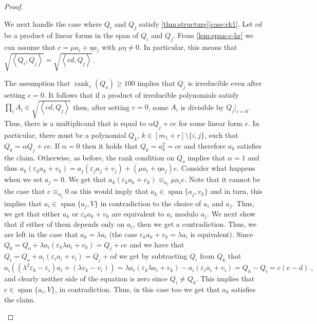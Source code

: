 \documentclass[10pt,a4paper]{article}
\def\rank{\operatorname{rank}}
\newcommand{\ideal}[1]{\left \langle{#1}\right \rangle}
\newcommand{\spn}[1]{\operatorname{span}\{{#1}\}}
\def\epsilon{\varepsilon}
\newcommand{\rkq}{100}
\begin{document}
\begin{proof}
\begin{enumerate}[label=(\roman*)]
	We next handle the case where $Q_i$ and $Q_j$ satisfy \autoref{thm:structure}\ref{case:rk1}. Let $cd$ be a product of linear forms in the span of $Q_i$ and $Q_j$. From \autoref{lem:span-c-hr} we can assume that $c=\mu a_i+\eta a_j$ with $\mu\eta\neq 0$. In particular, this means that $\sqrt{\ideal{Q_i,Q_j}} = \sqrt{\ideal{cd,Q_j}}$. 
	
	The assumption that $\rank_s(Q_o)\geq \rkq$ implies that $Q_j$ is irreducible even after setting $c=0$. It follows that if a product of irreducible polynomials satisfy $\prod_i A_i \in  \sqrt{\ideal{cd,Q_j}}$ then, after setting $c=0$, some $A_i$ is divisible by ${Q_j}|_{c=0}$. Thus, there is a multiplicand that is equal to $ \alpha Q_j + ce$ for some linear form $e$. In particular, there must be a polynomial $Q_k$, $k\in[m_1+r]\setminus \{i,j\}$, such that  $Q_k = \alpha Q_j + ce$.
	If $\alpha = 0$ then it holds that $Q_k = a_k^2 = ce$ and therefore $a_k$ satisfies the claim. Otherwise, as before, the rank condition on $Q_o$ implies that $\alpha = 1$ and thus $ a_k(\epsilon_k a_k +v_k) =  a_j(\epsilon_j a_j + v_j) + (\mu a_i + \eta a_j)e$. 
	Consider what happens when we set $a_j=0$. We get that $a_k(\epsilon_k a_k +v_k) \equiv_{a_j} \mu a_i e$.  Note that it cannot be the case that $e\equiv_{a_j}0$ as this would imply that $a_k\in\spn{a_j,v_k}$ and in turn, this implies that $a_i \in \spn{a_j,V}$ in contradiction to the choice of $a_i$ and $a_j$. Thus, we get that either $a_k$ or $\epsilon_k a_k +v_k$ are equivalent to $a_i$ modulo $a_j$. We next show that if either of them depends only on $a_i$, then we get a contradiction. Thus, we are left in the case that $a_k = \lambda a_i$ (the case $\epsilon_k a_k + v_k = \lambda a_i$ is equivalent).  Since $Q_k = Q_o+  \lambda a_i\left(\epsilon_k  \lambda a_i + v_k\right) = Q_j + ce$ and we have that $Q_i = Q_o + a_i(\epsilon_i a_i + v_i) = Q_j + cd$ we get by subtracting $Q_i$ from $Q_k$ that 
	\[a_i\left((\lambda^2\epsilon_k - \epsilon_i)a_i + (\lambda v_k -v_i)\right) =\lambda a_i(\epsilon_k  \lambda a_i + v_k) - a_i(\epsilon_i   a_i + v_i) = Q_k-Q_i=c(e-d) \;,\]
	and clearly neither side of the equation is zero since $Q_i\neq Q_k$. 
	This implies that $c \in \spn{a_i,V}$, in contradiction. Thus, in this case too we get that $a_k$ satisfies the claim.
	

\end{enumerate}
\end{proof}
\end{document}
